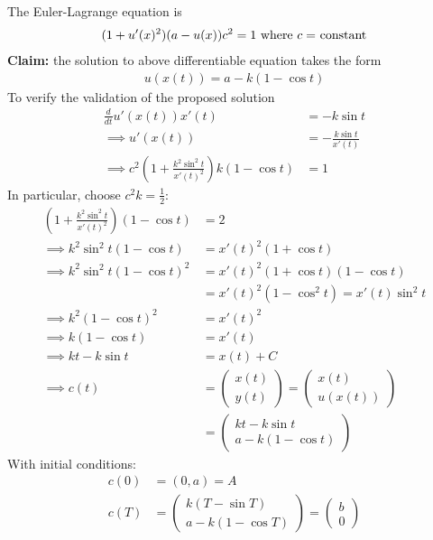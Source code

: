 \documentclass{article}
\begin{document}
\begin{example}
		The Euler-Lagrange equation is
		\begin{align}
			(1 + u'(x)^2)(a - u(x))c^2 = 1\ \text{{where $c=$ constant}}
		\end{align}
		\textbf{Claim:} the solution to above differentiable equation takes the form
		\begin{align}
			u(x(t)) = a - k(1 - \cos t)
		\end{align}
		To verify the validation of the proposed solution
		\begin{align}
			\frac{d}{dt} u'(x(t)) x'(t) &= - k \sin t \\
			\implies u'(x(t)) &= -\frac{k \sin t}{x'(t)} \\
			\implies c^2 \left(1 + \frac{k^2 \sin^2 t}{x'(t)^2} \right) k (1 - \cos t) &= 1
		\end{align}
		In particular, choose $c^2 k = \frac{1}{2}$:
		\begin{align}
			\left(1 + \frac{k^2 \sin^2 t}{x'(t)^2} \right) (1 - \cos t) &= 2 \\
			\implies k^2 \sin^2 t (1 - \cos t) &= x'(t)^2 (1 + \cos t) \\
			\implies k^2 \sin^2 t (1 - \cos t)^2 &= x'(t)^2 (1 + \cos t) (1 - \cos t) \\
			&= x'(t)^2(1 - \cos^2 t) = x'(t) \sin^2 t \\
			\implies k^2(1 - \cos t)^2 &= x'(t)^2 \\
			\implies k (1 - \cos t) &= x'(t) \\
			\implies k t - k \sin t &= x(t) + C \\
			\implies c(t) &= \begin{pmatrix}
				x(t) \\ y(t)
			\end{pmatrix} = \begin{pmatrix}
				x(t) \\ u(x(t))
			\end{pmatrix} \\
			&= \begin{pmatrix}
				kt - k\sin t \\
				a - k(1 - \cos t)
			\end{pmatrix}
		\end{align}
		With initial conditions:
		\begin{align}
			c(0) &= (0, a) = A \\
			c(T) &= \begin{pmatrix}
				k(T - \sin T) \\
				a - k(1 - \cos T)
			\end{pmatrix} = \begin{pmatrix}
				b \\ 0
			\end{pmatrix}
		\end{align}
	\end{example}
	
\end{document}

